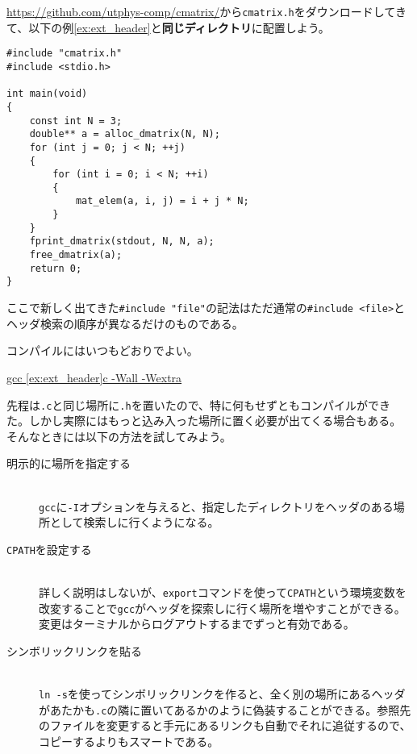 \url{https://github.com/utphys-comp/cmatrix/}から\texttt{cmatrix.h}をダウンロードしてきて、以下の例\ref{ex:ext_header}と\textbf{同じディレクトリ}に配置しよう。

\begin{reidai}\label{ex:ext_header}
    \begin{verbatim}
#include "cmatrix.h"
#include <stdio.h>

int main(void)
{
    const int N = 3;
    double** a = alloc_dmatrix(N, N);
    for (int j = 0; j < N; ++j)
    {
        for (int i = 0; i < N; ++i)
        {
            mat_elem(a, i, j) = i + j * N;
        }
    }
    fprint_dmatrix(stdout, N, N, a);
    free_dmatrix(a);
    return 0;
}
\end{verbatim}
\end{reidai}
ここで新しく出てきた\texttt{\#include "file"}の記法はただ通常の\texttt{\#include <file>}とヘッダ検索の順序が異なるだけのものである。

コンパイルにはいつもどおりでよい。

\begin{commandline2}
    \prompt \underline{gcc \ref{ex:ext_header}c -Wall -Wextra}
\end{commandline2} \noindent

先程は\texttt{.c}と同じ場所に\texttt{.h}を置いたので、特に何もせずともコンパイルができた。しかし実際にはもっと込み入った場所に置く必要が出てくる場合もある。
そんなときには以下の方法を試してみよう。
\begin{description}
    \item[明示的に場所を指定する]\mbox{}\\
          \texttt{gcc}に\texttt{-I}オプションを与えると、指定したディレクトリをヘッダのある場所として検索しに行くようになる。
    \item[\texttt{CPATH}を設定する]\mbox{}\\
          詳しく説明はしないが、\texttt{export}コマンドを使って\texttt{CPATH}という環境変数を改変することで\texttt{gcc}がヘッダを探索しに行く場所を増やすことができる。変更はターミナルからログアウトするまでずっと有効である。
    \item[シンボリックリンクを貼る]\mbox{}\\
          \texttt{ln -s}を使ってシンボリックリンクを作ると、全く別の場所にあるヘッダがあたかも\texttt{.c}の隣に置いてあるかのように偽装することができる。参照先のファイルを変更すると手元にあるリンクも自動でそれに追従するので、コピーするよりもスマートである。
\end{description}

